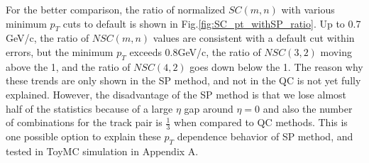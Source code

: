   For the better comparison, the ratio of normalized $SC(m,n)$ with various minimum $p_T$ cuts to default is shown in Fig.\ref{fig:SC_pt_withSP_ratio}. Up to 0.7 GeV/c, the ratio of $NSC(m,n)$ values are consistent with a default cut within errors, but the minimum $p_T$ exceeds 0.8GeV/c, the ratio of $NSC(3,2)$ moving above the 1, and the ratio of $NSC(4,2)$ goes down below the 1. The reason why these trends are only shown in the SP method, and not in the QC is not yet fully explained. However, the disadvantage of the SP method is that we lose almost half of the statistics because of a large $\eta$ gap around $\eta=0$ and also the number of combinations for the track pair is $\frac{1}{3}$ when compared to QC methods. This is one possible option to explain these $p_T$ dependence behavior of SP method, and  tested in ToyMC simulation in Appendix A.

